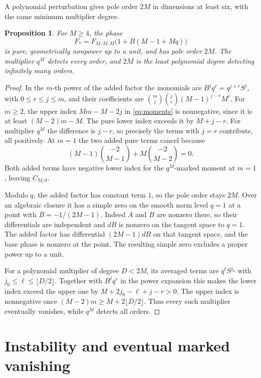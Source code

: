 \documentclass[11pt]{article}
\newtheorem{proposition}[theorem]{Proposition}
\begin{document}
A polynomial perturbation gives pole order \(2M\) in dimensions at
least six, with the same minimum multiplier degree.

\begin{proposition}\label{prop:perturb}
For \(M\ge4\), the phase
\[
   F_*=F_{M,M,M}\bigl(1+B(M-1+Mq)\bigr)
\]
is pure, geometrically nonpower up to a unit, and has pole order
\(2M\). The multiplier \(q^M\) detects every order, and \(2M\) is the
least polynomial degree detecting infinitely many orders.
\end{proposition}

\begin{proof}
In the \(m\)-th power of the added factor the monomials are
\(B^j q^r=q^{j+r}S^j\), with \(0\le r\le j\le m\), and their
coefficients are \(\binom mj\binom jr(M-1)^{j-r}M^r\).
For \(m\ge2\), the upper index \(Mm-M-2j\) in \eqref{eq:moments}
is nonnegative, since it is at least \((M-2)m-M\).
The pure lower index exceeds it by \(M+j-r\).
For multiplier \(q^M\) the difference is \(j-r\), so precisely
the terms with \(j=r\) contribute, all positively. At \(m=1\)
the two added pure terms cancel because
\[
  (M-1)\binom{-2}{M-1}+M\binom{-2}{M-2}=0.
\]
Both added terms have negative lower index for the \(q^M\)-marked
moment at \(m=1\), leaving \(C_{M,0}\).

Modulo \(q\), the added factor has constant term \(1\), so the pole
order stays \(2M\). Over an algebraic closure it has a simple zero
on the smooth norm level \(q=1\) at a point with \(B=-1/(2M-1)\).
Indeed \(A\) and \(B\) are nonzero there, so their differentials are
independent and \(dB\) is nonzero on the tangent space to \(q=1\).
The added factor has differential \((2M-1)dB\) on that tangent
space, and the base phase is nonzero at the point. The resulting
simple zero excludes a proper power up to a unit.

For a polynomial multiplier of degree \(D<2M\), its averaged terms
are \(q^\ell S^{j_0}\) with \(j_0\le\ell\le\lfloor D/2\rfloor\).
Together with \(B^j q^r\) in the power expansion this makes the
lower index exceed the upper one by \(M+2j_0-\ell+j-r>0\).
The upper index is nonnegative once
\((M-2)m\ge M+2\lfloor D/2\rfloor\). Thus every such multiplier
eventually vanishes, while \(q^M\) detects all orders.
\renewcommand{\qedsymbol}{}%
\end{proof}

\section{Instability and eventual marked vanishing}\label{sec:nullcone}
\end{document}
